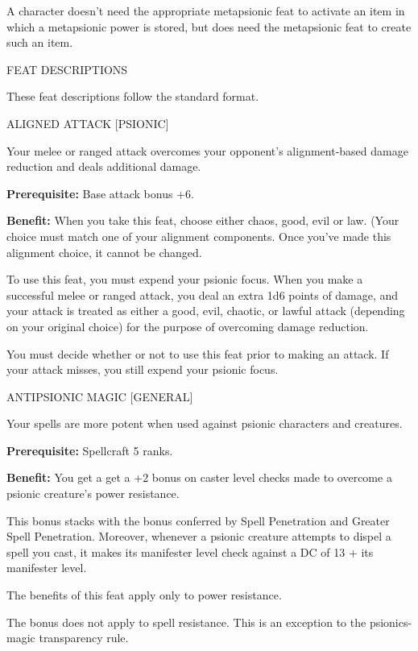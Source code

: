 \documentclass{article}
\begin{document}
A character doesn't need the appropriate metapsionic feat to activate an item in 
which a metapsionic power is stored, but does need the metapsionic feat to create 
such an item.

\vspace{12pt}
{\LARGE{}FEAT DESCRIPTIONS}

These feat descriptions follow the standard format.

\vspace{12pt}
ALIGNED ATTACK [PSIONIC]

Your melee or ranged attack overcomes your opponent's alignment-based damage reduction 
and deals additional damage.

\textbf{Prerequisite:} Base attack bonus +6.

\textbf{Benefit:} When you take this feat, choose either chaos, good, evil or law. 
(Your choice must match one of your alignment components. Once you've made this 
alignment choice, it cannot be changed.

To use this feat, you must expend your psionic focus. When you make a successful 
melee or ranged attack, you deal an extra 1d6 points of damage, and your attack 
is treated as either a good, evil, chaotic, or lawful attack (depending on your 
original choice) for the purpose of overcoming damage reduction.

You must decide whether or not to use this feat prior to making an attack. If your 
attack misses, you still expend your psionic focus.

\vspace{12pt}
ANTIPSIONIC MAGIC [GENERAL]

Your spells are more potent when used against psionic characters and creatures.

\textbf{Prerequisite:} Spellcraft 5 ranks.

\textbf{Benefit:} You get a get a +2 bonus on caster level checks made to overcome 
a psionic creature's power resistance.

This bonus stacks with the bonus conferred by Spell Penetration and Greater Spell 
Penetration. Moreover, whenever a psionic creature attempts to dispel a spell you 
cast, it makes its manifester level check against a DC of 13 + its manifester level.

The benefits of this feat apply only to power resistance. 

The bonus does not apply to spell resistance. This is an exception to the psionics-magic 
transparency rule.
\end{document}
